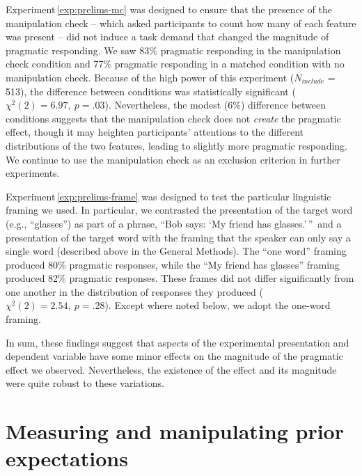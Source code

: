 \documentclass[man,noapacite]{apa2}
\newcounter{Experiment}
\newcommand{\exptref}[1]{Experiment\,\ref{#1}}
\begin{document}
\exptref{exp:prelims-mc} was designed to ensure that the presence of the manipulation check -- which asked participants to count how many of each feature was present -- did not induce a task demand that changed the magnitude of pragmatic responding. We saw 83\% pragmatic responding in the manipulation check condition and 77\% pragmatic responding in a matched condition with no manipulation check. Because of the high power of this experiment ($N_{include}$ = 513), the difference between conditions was statistically significant ($\chi^2(2) = 6.97,~p = .03$). Nevertheless, the modest (6\%) difference between conditions suggests that the manipulation check does not \emph{create} the pragmatic effect, though it may heighten participants' attentions to the different distributions of the two features, leading to slightly more pragmatic responding. We continue to use the manipulation check as an exclusion criterion in further experiments.

\exptref{exp:prelims-frame} was designed to test the particular linguistic framing we used. In particular, we contrasted the presentation of the target word (e.g., ``glasses'') as part of a phrase, ``Bob says: `My friend has glasses.'\,''\ and a presentation of the target word with the framing that the speaker can only say a single word (described above in the General Methods). The ``one word'' framing produced 80\% pragmatic responses, while the ``My friend has glasses'' framing produced 82\% pragmatic responses. These frames did not differ significantly from one another in the distribution of responses they produced ($\chi^2(2) = 2.54,~p = .28$). Except where noted below, we adopt the one-word framing.

In sum, these findings suggest that aspects of the experimental presentation and dependent variable have some minor effects on the magnitude of the pragmatic effect we observed. Nevertheless, the existence of the effect and its magnitude were quite robust to these variations.

\section{Measuring and manipulating prior expectations}
\label{sec:prior}
\end{document}
